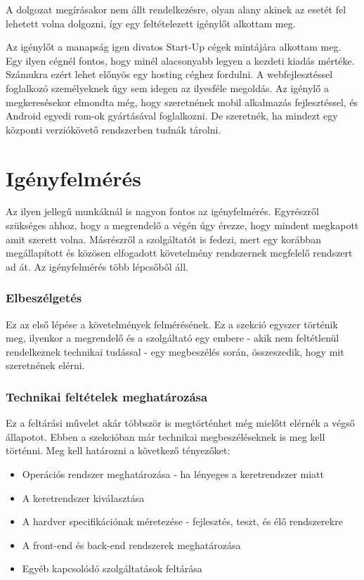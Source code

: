 \documentclass[12pt,oneside,justify,table]{book}
\begin{document}
A dolgozat megírásakor nem állt rendelkezésre, olyan alany akinek az esetét fel lehetett volna dolgozni, így egy feltételezett igénylőt alkottam meg. 

Az igénylőt a manapság igen divatos Start-Up cégek mintájára alkottam meg. Egy ilyen cégnél fontos, hogy minél alacsonyabb legyen a kezdeti kiadás mértéke. Számukra ezért lehet előnyös egy hosting céghez fordulni. A webfejlesztéssel foglalkozó személyeknek úgy sem idegen az ilyesféle megoldás. Az igénylő a megkeresésekor elmondta még, hogy szeretnének mobil alkalmazás fejlesztéssel, és Android egyedi rom-ok gyártásával foglalkozni. De szeretnék, ha mindezt egy központi verziókövető rendszerben tudnák tárolni. 

\section{Igényfelmérés}
Az ilyen jellegű munkáknál is nagyon fontos az igényfelmérés. Egyrészről szükséges ahhoz, hogy a megrendelő a végén úgy érezze, hogy mindent megkapott amit szerett volna. Másrészről a szolgáltatót is fedezi, mert egy korábban megállapított és közösen elfogadott követelmény rendszernek megfelelő rendszert ad át.
\newline
\newline
Az igényfelmérés több lépcsőből áll. 
\subsubsection{Elbeszélgetés}
Ez az első lépése a követelmények felmérésének. Ez a szekció egyszer történik meg, ilyenkor a megrendelő és a szolgáltató egy embere - akik nem feltétlenül rendelkeznek technikai tudással - egy megbeszélés során, összeszedik, hogy mit szeretnének elérni. 

\subsubsection{Technikai feltételek meghatározása}
Ez a feltárási művelet akár többször is megtörténhet még mielőtt elérnék a végső állapotot. Ebben a szekcióban már technikai megbeszéléseknek is meg kell történni. 
Meg kell határozni a következő tényezőket:
\begin{itemize}
	\item Operációs rendszer meghatározása - ha lényeges a keretrendszer miatt
	\item A keretrendszer kiválasztása
	\item A hardver specifikációnak méretezése - fejlesztés, teszt, és élő rendszerekre
	\item A front-end és back-end rendszerek meghatározása
	\item Egyéb kapcsolódó szolgáltatások feltárása 
\end{itemize}
\end{document}
